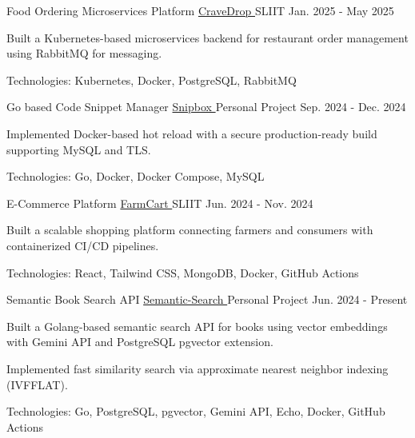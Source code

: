 
\begin{cventries}

  \cventry
    {Food Ordering Microservices Platform}
    {\href{https://github.com/nmdra/CraveDrop}{CraveDrop \faGithub}}
    {SLIIT}
    {Jan. 2025 - May 2025}
    {
      \begin{cvitems}
        \item {Built a Kubernetes-based microservices backend for restaurant order management using RabbitMQ for messaging.}
        \item {Technologies: Kubernetes, Docker, PostgreSQL, RabbitMQ}
      \end{cvitems}
    }

  \cventry
    {Go based Code Snippet Manager}
    {\href{https://github.com/nmdra/snipbox}{Snipbox \faGithub}}
    {Personal Project}
    {Sep. 2024 - Dec. 2024}
    {
      \begin{cvitems}
        \item {Implemented Docker-based hot reload with a secure production-ready build supporting MySQL and TLS.}
        \item {Technologies: Go, Docker, Docker Compose, MySQL}
      \end{cvitems}
    }

  \cventry
    {E-Commerce Platform}
    {\href{https://github.com/nmdra/FarmCart}{FarmCart \faGithub}}
    {SLIIT}
    {Jun. 2024 - Nov. 2024}
    {
      \begin{cvitems}
        \item {Built a scalable shopping platform connecting farmers and consumers with containerized CI/CD pipelines.}
        \item {Technologies: React, Tailwind CSS, MongoDB, Docker, GitHub Actions}
      \end{cvitems}
    }


  \cventry
   {Semantic Book Search API}
   {\href{https://github.com/nmdra/Semantic-Search}{Semantic-Search \faGithub}}
   {Personal Project}
   {Jun. 2024 - Present}
   {
      \begin{cvitems}
        \item {Built a Golang-based semantic search API for books using vector embeddings with Gemini API and PostgreSQL pgvector extension.}
        \item {Implemented fast similarity search via approximate nearest neighbor indexing (IVFFLAT).}
        \item {Technologies: Go, PostgreSQL, pgvector, Gemini API, Echo, Docker, GitHub Actions}
      \end{cvitems}
   }


\end{cventries}
